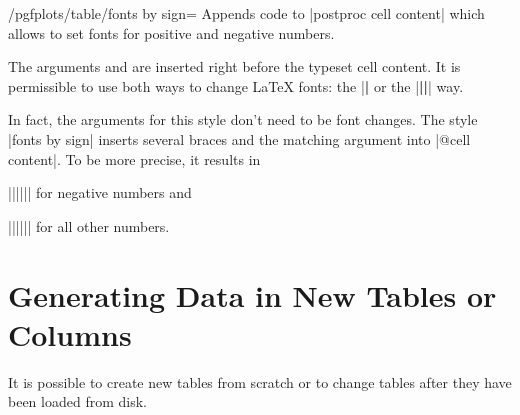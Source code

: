 \begin{stylekey}{/pgfplots/table/fonts by sign=}
    Appends code to |postproc cell content| which allows to set fonts for
    positive and negative numbers.

    The arguments  and  are inserted right before the typeset cell content. It is
    permissible to use both ways to change \LaTeX{} fonts: the
    |\textbf| or the |{\bfseries ||}| way.

\begin{codeexample}[pre={\begin{lateximage}},post={\end{lateximage}}]

%

\end{codeexample}
    In fact, the arguments for this style don't need to be font changes. The
    style |fonts by sign| inserts several braces and the matching argument into
    |@cell content|. To be more precise, it results in

    |{||{||}}| for negative
    numbers and

    |{||{||}}| for all other
    numbers.
\end{stylekey}


\section[pgfplotstable-createcol]{Generating Data in New Tables or Columns}
\label{pgfplotstable:createcol}

It is possible to create new tables from scratch or to change tables after they
have been loaded from disk.


